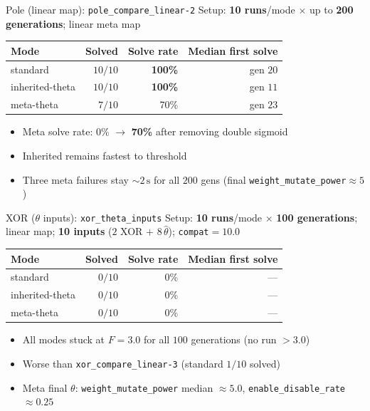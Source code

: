 \documentclass[aspectratio=169,11pt]{beamer}
\begin{document}
\begin{frame}{Pole (linear map): \texttt{pole\_compare\_linear-2}}
  Setup: \textbf{10 runs}/mode $\times$ up to \textbf{200 generations}; linear meta map

  \vspace{0.6em}
  \begin{tabular}{lrrr}
    \toprule
    Mode & Solved & Solve rate & Median first solve \\
    \midrule
    standard & $10/10$ & \textbf{100\%} & gen $20$ \\
    inherited-theta & $10/10$ & \textbf{100\%} & gen $11$ \\
    meta-theta & $7/10$ & 70\% & gen $23$ \\
    \bottomrule
  \end{tabular}

  \vspace{0.6em}
  \begin{itemize}
    \item Meta solve rate: $0\%$ $\rightarrow$ \textbf{70\%} after removing double sigmoid
    \item Inherited remains fastest to threshold
    \item Three meta failures stay $\sim 2\,\mathrm{s}$ for all $200$ gens
      (final \texttt{weight\_mutate\_power}${}\approx 5$)
  \end{itemize}
\end{frame}

\begin{frame}{XOR ($\theta$ inputs): \texttt{xor\_theta\_inputs}}
  Setup: \textbf{10 runs}/mode $\times$ \textbf{100 generations}; linear map;
  \textbf{10 inputs} ($2$ XOR $+$ $8\,\hat\theta$); \texttt{compat}${}=10.0$

  \vspace{0.6em}
  \begin{tabular}{lrrr}
    \toprule
    Mode & Solved & Solve rate & Median first solve \\
    \midrule
    standard & $0/10$ & 0\% & --- \\
    inherited-theta & $0/10$ & 0\% & --- \\
    meta-theta & $0/10$ & 0\% & --- \\
    \bottomrule
  \end{tabular}

  \vspace{0.6em}
  \begin{itemize}
    \item All modes stuck at $F=3.0$ for all $100$ generations (no run $>3.0$)
    \item Worse than \texttt{xor\_compare\_linear-3} (standard $1/10$ solved)
    \item Meta final $\theta$: \texttt{weight\_mutate\_power} median $\approx 5.0$,
      \texttt{enable\_disable\_rate} $\approx 0.25$
  \end{itemize}
\end{frame}
\end{document}
